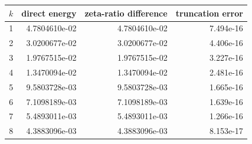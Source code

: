 \begin{tabular}{rrrr}
\toprule
$k$ & direct energy & zeta-ratio difference & truncation error\\
\midrule
1 & 4.7804610e-02 & 4.7804610e-02 & 7.494e-16\\
2 & 3.0200677e-02 & 3.0200677e-02 & 4.406e-16\\
3 & 1.9767515e-02 & 1.9767515e-02 & 3.227e-16\\
4 & 1.3470094e-02 & 1.3470094e-02 & 2.481e-16\\
5 & 9.5803728e-03 & 9.5803728e-03 & 1.665e-16\\
6 & 7.1098189e-03 & 7.1098189e-03 & 1.639e-16\\
7 & 5.4893011e-03 & 5.4893011e-03 & 1.266e-16\\
8 & 4.3883096e-03 & 4.3883096e-03 & 8.153e-17\\
\bottomrule
\end{tabular}